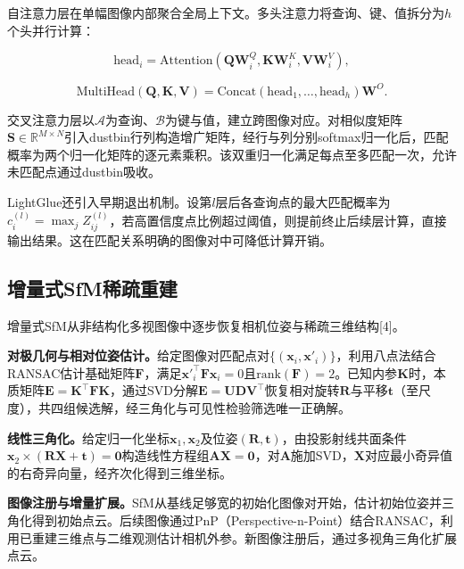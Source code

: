 \documentclass[UTF8,a4paper]{ctexart}
\begin{document}
自注意力层在单幅图像内部聚合全局上下文。多头注意力将查询、键、值拆分为$h$个头并行计算：

$$\text{head}_i = \text{Attention}\left(\boldsymbol{Q}\boldsymbol{W}_i^Q, \boldsymbol{K}\boldsymbol{W}_i^K, \boldsymbol{V}\boldsymbol{W}_i^V\right),$$

$$\text{MultiHead}(\boldsymbol{Q},\boldsymbol{K},\boldsymbol{V}) = \text{Concat}\left(\text{head}_1, \dots, \text{head}_h\right)\boldsymbol{W}^O.$$

交叉注意力层以$\mathcal{A}$为查询、$\mathcal{B}$为键与值，建立跨图像对应。对相似度矩阵$\boldsymbol{S} \in \mathbb{R}^{M \times N}$引入dustbin行列构造增广矩阵，经行与列分别softmax归一化后，匹配概率为两个归一化矩阵的逐元素乘积。该双重归一化满足每点至多匹配一次，允许未匹配点通过dustbin吸收。

LightGlue还引入早期退出机制。设第$l$层后各查询点的最大匹配概率为$c_i^{(l)} = \max_j Z_{ij}^{(l)}$，若高置信度点比例超过阈值，则提前终止后续层计算，直接输出结果。这在匹配关系明确的图像对中可降低计算开销。

\subsection{增量式SfM稀疏重建}

增量式SfM从非结构化多视图像中逐步恢复相机位姿与稀疏三维结构[4]。

\textbf{对极几何与相对位姿估计。}给定图像对匹配点对$\{(\boldsymbol{x}_i, \boldsymbol{x}'_i)\}$，利用八点法结合RANSAC估计基础矩阵$\boldsymbol{F}$，满足$\boldsymbol{x}'^{\top}_i \boldsymbol{F} \boldsymbol{x}_i = 0$且$\text{rank}(\boldsymbol{F}) = 2$。已知内参$\boldsymbol{K}$时，本质矩阵$\boldsymbol{E} = \boldsymbol{K}^{\top} \boldsymbol{F} \boldsymbol{K}$，通过SVD分解$\boldsymbol{E} = \boldsymbol{U} \boldsymbol{D} \boldsymbol{V}^{\top}$恢复相对旋转$\boldsymbol{R}$与平移$\boldsymbol{t}$（至尺度），共四组候选解，经三角化与可见性检验筛选唯一正确解。

\textbf{线性三角化。}给定归一化坐标$\boldsymbol{x}_1, \boldsymbol{x}_2$及位姿$(\boldsymbol{R}, \boldsymbol{t})$，由投影射线共面条件$\boldsymbol{x}_2 \times (\boldsymbol{R}\boldsymbol{X} + \boldsymbol{t}) = \boldsymbol{0}$构造线性方程组$\boldsymbol{A}\boldsymbol{X} = \boldsymbol{0}$，对$\boldsymbol{A}$施加SVD，$\boldsymbol{X}$对应最小奇异值的右奇异向量，经齐次化得到三维坐标。

\textbf{图像注册与增量扩展。}SfM从基线足够宽的初始化图像对开始，估计初始位姿并三角化得到初始点云。后续图像通过PnP（Perspective-n-Point）结合RANSAC，利用已重建三维点与二维观测估计相机外参。新图像注册后，通过多视角三角化扩展点云。
\end{document}
